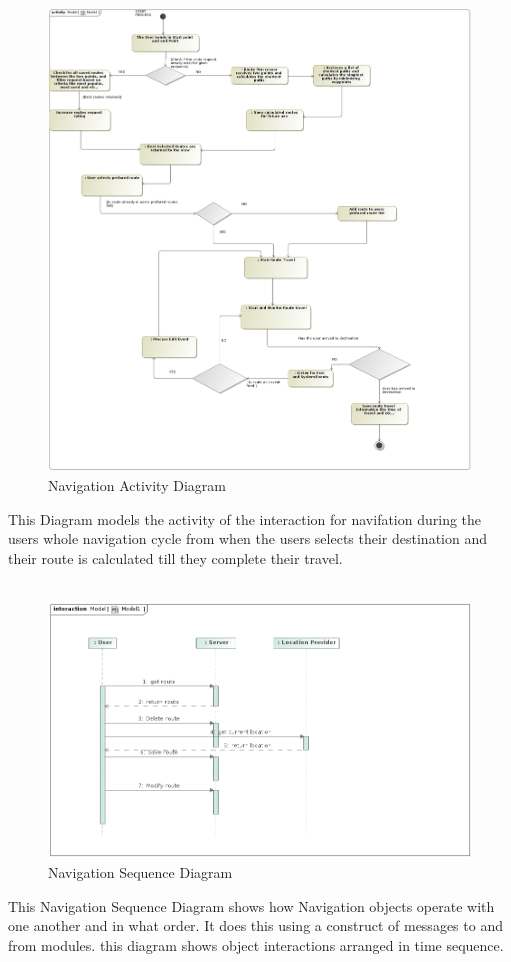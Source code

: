 \documentclass{article}
\begin{document}
				\begin{figure}[H]
					\includegraphics[scale=0.3]{Diagrams/Activity_Diagram_Navigation.JPG}
					\caption{Navigation Activity Diagram}	
				\end{figure}
				{This Diagram models the activity of the interaction for navifation during the users whole navigation cycle from when the users selects their destination and their route is calculated till they complete their travel.\\\\}
				
				\begin{figure}[H]
					\includegraphics[scale=0.5]{Diagrams/Sequence_Diagram_Navigation.JPG}
					\caption{Navigation Sequence Diagram}	
				\end{figure}
				{This Navigation Sequence Diagram shows how Navigation objects operate with one another and in what order. It does this using a construct of messages to and from modules. this diagram shows object interactions arranged in time sequence.\\\\}
				
\end{document}
